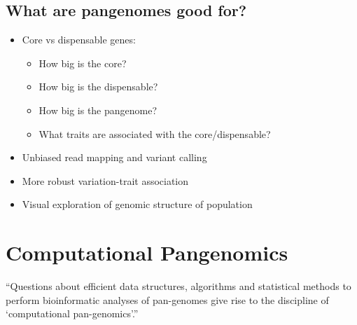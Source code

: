\documentclass[
]{book}
\providecommand{\tightlist}{%
  \setlength{\itemsep}{0pt}\setlength{\parskip}{0pt}}
\begin{document}
\hypertarget{what-are-pangenomes-good-for}{%
\subsection{What are pangenomes good for?}\label{what-are-pangenomes-good-for}}

\begin{itemize}
\tightlist
\item
  Core vs dispensable genes:

  \begin{itemize}
  \tightlist
  \item
    How big is the core?
  \item
    How big is the dispensable?
  \item
    How big is the pangenome?
  \item
    What traits are associated with the core/dispensable?
  \end{itemize}
\item
  Unbiased read mapping and variant calling
\item
  More robust variation-trait association
\item
  Visual exploration of genomic structure of population
\end{itemize}

\hypertarget{computational-pangenomics}{%
\section{Computational Pangenomics}\label{computational-pangenomics}}

``Questions about efficient data structures, algorithms and statistical methods to perform bioinformatic analyses of pan-genomes give rise to the discipline of `computational pan-genomics'.''
\end{document}
